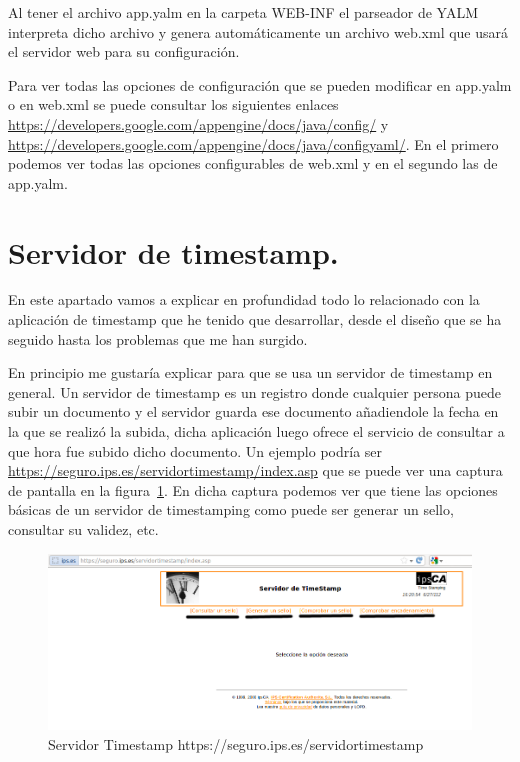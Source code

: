 Al tener el archivo app.yalm en la carpeta WEB-INF el parseador de YALM  interpreta dicho archivo y genera automáticamente un archivo web.xml que usará el servidor web para su configuración.

Para ver todas las opciones de configuración que se pueden modificar en app.yalm o en web.xml se puede consultar los siguientes enlaces \url{https://developers.google.com/appengine/docs/java/config/} y \url{https://developers.google.com/appengine/docs/java/configyaml/}. En el primero podemos ver todas las opciones configurables de web.xml y en el segundo las de app.yalm.




\section{Servidor de timestamp.}

En este apartado vamos a explicar en profundidad todo lo relacionado con la aplicación de timestamp que he tenido que desarrollar, desde el diseño que se ha seguido hasta los problemas que me han surgido.

En principio me gustaría explicar para que se usa un servidor de timestamp en general. Un servidor de timestamp es un registro donde cualquier persona puede subir un documento y el servidor guarda ese documento añadiendole la fecha en la que se realizó la subida, dicha aplicación luego ofrece el servicio de consultar a que hora fue subido dicho documento. Un ejemplo podría ser \url{https://seguro.ips.es/servidortimestamp/index.asp} que se puede ver una captura de pantalla en la figura~\ref{fig:server_ips_timestamp}. En dicha captura podemos ver que tiene las opciones básicas de un servidor de timestamping como puede ser generar un sello, consultar su validez, etc. 

\begin{figure}[h]
  \centering
    \includegraphics[scale=0.5]{./GoogleAppEngine/imagenes/server_ips_timestamp.png}
  \caption{Servidor Timestamp https://seguro.ips.es/servidortimestamp}
  \label{fig:server_ips_timestamp}
\end{figure}

